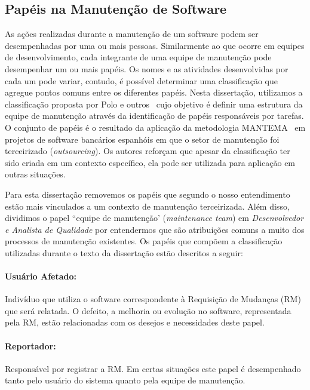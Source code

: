\subsection{Papéis na Manutenção de Software}\label{subsec:man_visao_geral_papeis_na_manutencao_de_software}

As ações realizadas durante a manutenção de um software podem ser desempenhadas
por uma ou mais pessoas. Similarmente ao que ocorre em equipes de
desenvolvimento, cada integrante de uma equipe de manutenção pode desempenhar
um ou mais papéis. Os nomes e as atividades desenvolvidas por cada um pode
variar, contudo, é possível determinar uma classificação que agregue pontos
comuns entre os diferentes papéis. Nesta dissertação, utilizamos a
classificação proposta por Polo e outros~\cite{Polo1999} cujo objetivo é
definir uma estrutura da equipe de manutenção através da identificação de
papéis responsáveis por tarefas. O conjunto de papéis é o resultado da
aplicação da metodologia MANTEMA~\cite{756695} em projetos de software
bancários espanhóis em que o setor de manutenção foi terceirizado
(\textit{outsourcing}). Os autores reforçam que apesar da classificação ter
sido criada em um contexto específico, ela pode ser utilizada para aplicação em
outras situações.

Para esta dissertação removemos os papéis que segundo o nosso entendimento
estão mais vinculados a um contexto de manutenção terceirizada. Além disso,
dividimos o papel ``equipe de manutenção' (\textit{maintenance team}) em
\textit{Desenvolvedor e Analista de Qualidade} por entendermos que são
atribuições comuns a muito dos processos de manutenção existentes. Os papéis
que compõem a classificação utilizadas durante o texto da dissertação estão
descritos a seguir:

\paragraph{Usuário Afetado:}
Indivíduo que utiliza o software correspondente à Requisição de Mudanças (RM)
que será relatada. O defeito, a melhoria ou evolução no software, representada
pela RM, estão relacionadas com os desejos e necessidades deste papel.

\paragraph{Reportador:}
Responsável por registrar a RM\@. Em certas situações este papel é desempenhado
tanto pelo usuário do sistema quanto pela equipe de manutenção.

